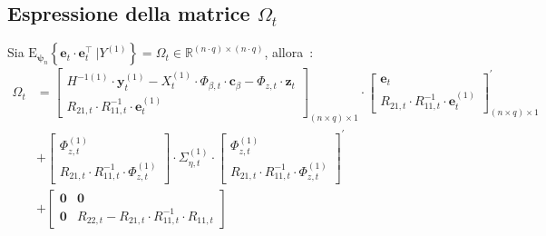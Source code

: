 \subsection[Espressione della matrice $\Omega_t$]{Espressione della matrice $\Omega_t$}
Sia $\text{E}_{\boldsymbol{\psi}_n}\left\{\mathbf{e}_t\cdot\mathbf{e}_t^\top \ \bigg|Y^{(1)}\right\} = \Omega_t\in\mathbb{R}^{(n\cdot q)\times(n\cdot q)}$, allora~\cite{paper_TS_book}:
\begin{equation}
	\begin{split}
		\Omega_t & = \begin{bmatrix}
			H^{-1(1)}\cdot\mathbf{y}_t^{(1)} - X_t^{(1)}\cdot\Phi_{\beta, t}\cdot\mathbf{c}_\beta - \Phi_{z, t}\cdot\mathbf{z}_t \\
			R_{21, t}\cdot R_{11,t}^{-1}\cdot\mathbf{e}_t^{(1)}
		\end{bmatrix}_{(n\times q)\times 1} \cdot \begin{bmatrix}
		\mathbf{e}_t \\
		R_{21,t}\cdot R_{11, t}^{-1}\cdot\mathbf{e}_t^{(1)}
	\end{bmatrix}^\prime_{(n\times q)\times 1} \\
	& + \begin{bmatrix}
		\Phi_{z,t}^{(1)} \\
		R_{21, t}\cdot R_{11, t}^{-1}\cdot\Phi_{z,t}^{(1)}
	\end{bmatrix}\cdot\Sigma_{\eta, t}^{(1)}\cdot \begin{bmatrix}
		\Phi_{z,t}^{(1)} \\
	R_{21, t}\cdot R_{11, t}^{-1}\cdot\Phi_{z,t}^{(1)}
	\end{bmatrix}^\prime \\
	& + \begin{bmatrix}
		\mathbf{0} & \mathbf{0}\\
		\mathbf{0} & R_{22,t} - R_{21,t}\cdot R_{11,t}^{-1}\cdot R_{11, t}
	\end{bmatrix}
	\end{split}
\end{equation}
